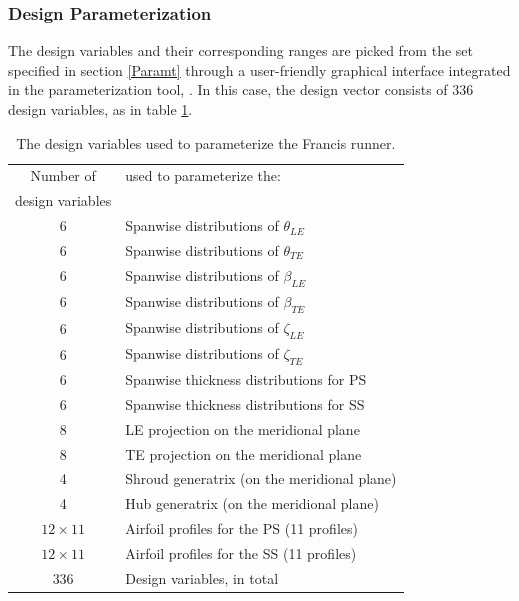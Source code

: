 \subsubsection{Design Parameterization}
The design variables and their corresponding ranges are picked from the set specified in section \ref{Paramt} through a user-friendly graphical interface integrated in the parameterization tool, \cite{dipl_livia,dipl_simon}.  In this  case, the design vector consists of $336$ design variables, as in table \ref{design_vars}.




\begin{table}[h!]
\begin{center}
\begin{tabular}{ |c|l| }
\hline

Number of              & used to parameterize the:\\
design variables       & \\
\hline
6 & Spanwise distributions of $\theta_{LE}$\\
\hline
6 & Spanwise distributions of $\theta_{TE}$\\
\hline
6 & Spanwise distributions of $\beta_{LE}$\\
\hline
6 & Spanwise distributions of $\beta_{TE}$\\
\hline
6 & Spanwise distributions of $\zeta_{LE}$\\
\hline
6 & Spanwise distributions of $\zeta_{TE}$\\
\hline
6 & Spanwise thickness distributions for PS \\
\hline
6 & Spanwise thickness distributions for SS\\
\hline
8 & LE projection on the meridional plane\\
\hline
8 & TE projection on the meridional plane\\
\hline
4 & Shroud generatrix (on the meridional plane) \\
\hline
4 & Hub generatrix (on the meridional plane)\\
\hline
$12 \times 11$ & Airfoil profiles for the PS (11 profiles)\\
\hline
$12 \times 11$ & Airfoil profiles for the SS (11 profiles)\\
\hline
\hline
336 & Design variables, in total \\
\hline   
\end{tabular}
\caption{
The design variables used to parameterize the Francis runner.}
\label{design_vars}
\end{center}
\end{table}

